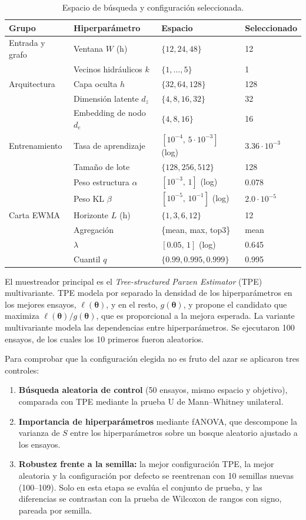 \documentclass[11pt,a4paper]{article}
\begin{document}
\begin{table}[h]
\centering
\caption{Espacio de búsqueda y configuración seleccionada.}
\label{tab:espacio}
\begin{tabular}{@{}llll@{}}
\toprule
Grupo & Hiperparámetro & Espacio & Seleccionado \\
\midrule
Entrada y grafo & Ventana $W$ (h) & $\{12,24,48\}$ & 12 \\
 & Vecinos hidráulicos $k$ & $\{1,\dots,5\}$ & 1 \\
\midrule
Arquitectura & Capa oculta $h$ & $\{32,64,128\}$ & 128 \\
 & Dimensión latente $d_z$ & $\{4,8,16,32\}$ & 32 \\
 & Embedding de nodo $d_e$ & $\{4,8,16\}$ & 16 \\
\midrule
Entrenamiento & Tasa de aprendizaje & $[10^{-4},\,5\cdot10^{-3}]$ (log) & $3.36\cdot10^{-3}$ \\
 & Tamaño de lote & $\{128,256,512\}$ & 128 \\
 & Peso estructura $\alpha$ & $[10^{-3},\,1]$ (log) & $0.078$ \\
 & Peso KL $\beta$ & $[10^{-5},\,10^{-1}]$ (log) & $2.0\cdot10^{-5}$ \\
\midrule
Carta EWMA & Horizonte $L$ (h) & $\{1,3,6,12\}$ & 12 \\
 & Agregación & \{mean, max, top3\} & mean \\
 & $\lambda$ & $[0.05,\,1]$ (log) & 0.645 \\
 & Cuantil $q$ & $\{0.99,0.995,0.999\}$ & 0.995 \\
\bottomrule
\end{tabular}
\end{table}

El muestreador principal es el \emph{Tree-structured Parzen Estimator} (TPE)
multivariante. TPE modela por separado la densidad de los hiperparámetros en los
mejores ensayos, $\ell(\bm\theta)$, y en el resto, $g(\bm\theta)$, y propone el
candidato que maximiza $\ell(\bm\theta)/g(\bm\theta)$, que es proporcional a la mejora
esperada. La variante multivariante modela las dependencias entre hiperparámetros.
Se ejecutaron 100 ensayos, de los cuales los 10 primeros fueron aleatorios.

Para comprobar que la configuración elegida no es fruto del azar se aplicaron tres
controles:
\begin{enumerate}
\item \textbf{Búsqueda aleatoria de control} (50 ensayos, mismo espacio y objetivo),
  comparada con TPE mediante la prueba U de Mann--Whitney unilateral.
\item \textbf{Importancia de hiperparámetros} mediante fANOVA, que descompone la
  varianza de $S$ entre los hiperparámetros sobre un bosque aleatorio ajustado a los
  ensayos.
\item \textbf{Robustez frente a la semilla:} la mejor configuración TPE, la mejor
  aleatoria y la configuración por defecto se reentrenan con 10 semillas nuevas
  (100--109). Solo en esta etapa se evalúa el conjunto de prueba, y las
  diferencias se contrastan con la prueba de Wilcoxon de rangos con signo, pareada
  por semilla.
\end{enumerate}
\end{document}
